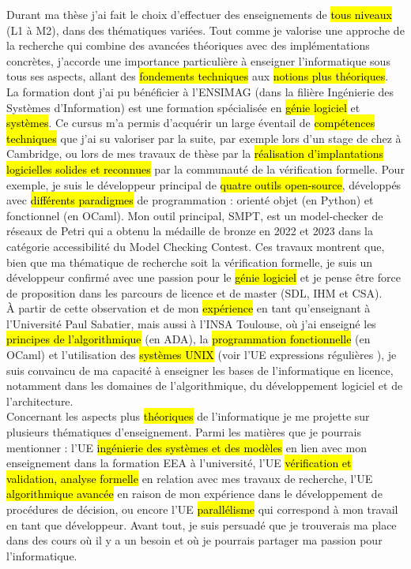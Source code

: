 \label{sec:projet_enseignement}
\vspace{10pt}

Durant ma thèse j'ai fait le choix d'effectuer des enseignements de \hl{tous
niveaux} (L1 à M2), dans des thématiques variées. Tout comme je valorise une
approche de la recherche qui combine des avancées théoriques avec des
implémentations concrètes, j'accorde une importance particulière à enseigner
l'informatique sous tous ses aspects, allant des \hl{fondements techniques} aux
\hl{notions plus théoriques}.\\

La formation dont j'ai pu bénéficier à l'ENSIMAG (dans la filière Ingénierie des
Systèmes d'Information) est une formation spécialisée en \hl{génie logiciel} et
\hl{systèmes}. Ce cursus m'a permis d'acquérir un large éventail de
\hl{compétences techniques} que j'ai su valoriser par la suite, par exemple lors
d'un stage de  chez  à Cambridge,
ou lors de mes travaux de thèse par la \hl{réalisation d'implantations
logicielles solides et reconnues} par la communauté de la vérification formelle.
Pour exemple, je suis le développeur principal de \hl{quatre outils
open-source}, développés avec \hl{différents paradigmes} de programmation :
orienté objet (en Python) et fonctionnel (en OCaml). Mon outil
principal, \textsf{SMPT}, est un model-checker de réseaux de Petri qui a obtenu
la médaille de bronze en 2022 et 2023 dans la catégorie \og accessibilité \fg du
Model Checking Contest. Ces travaux montrent que, bien que ma thématique de
recherche soit la vérification formelle, je suis un développeur confirmé avec
une passion pour le \hl{génie logiciel} et je pense être force de proposition
dans les parcours de licence et de master (SDL, IHM et CSA).\\

À partir de cette observation et de mon \hl{expérience} en tant qu'enseignant à
l'Université Paul Sabatier, mais aussi à l'INSA Toulouse, où j'ai enseigné les
\hl{principes de l'algorithmique} (en ADA), la \hl{programmation fonctionnelle}
(en OCaml) et l'utilisation des \hl{systèmes UNIX} (voir l'UE \og expressions
régulières \fg), je suis convaincu de ma capacité à enseigner les bases de
l'informatique en licence, notamment dans les domaines de l'algorithmique, du
développement logiciel et de l'architecture.\\

Concernant les aspects plus \hl{théoriques} de l'informatique je me projette sur
plusieurs thématiques d'enseignement. Parmi les matières que je pourrais
mentionner : l'UE \og \hl{ingénierie des systèmes et des modèles} \fg en lien
avec mon enseignement dans la formation EEA à l'université, l'UE \og
\hl{vérification et validation, analyse formelle} \fg en relation avec mes
travaux de recherche, l'UE \og \hl{algorithmique avancée} \fg en raison de mon
expérience dans le développement de procédures de décision, ou encore l'UE \og
\hl{parallélisme} \fg qui correspond à mon travail en tant que développeur.
Avant tout, je suis persuadé que je trouverais ma place dans des cours où il y a
un besoin et où je pourrais partager ma passion pour l'informatique.\\


